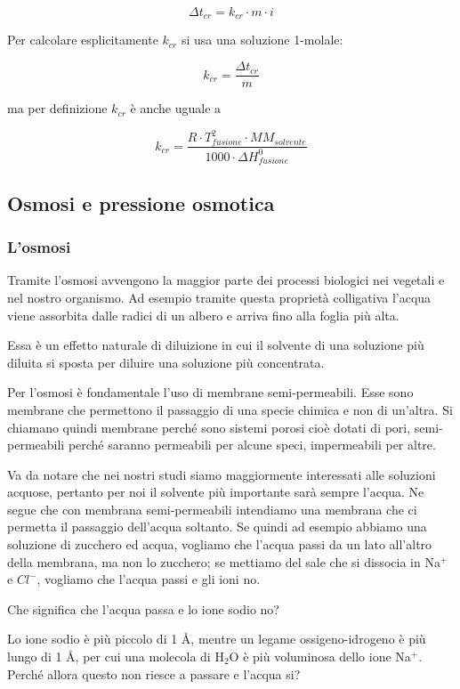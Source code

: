 $$\Delta t_{cr}=k_{cr} \cdot m \cdot i$$

Per calcolare esplicitamente $k_{cr}$ si usa una soluzione 1-molale:

$$k_{cr} = \frac{\Delta t_{cr}}{m}$$

ma per definizione $k_{cr}$ è anche uguale a

$$k_{cr}=\frac{R \cdot T_{fusione}^2 \cdot MM_{solvente}}{1000 \cdot \Delta H^0_{fusione}}$$

\subsection{Osmosi e pressione osmotica}
\subsubsection{L'osmosi}
Tramite l'osmosi avvengono la maggior parte dei processi biologici nei vegetali e nel nostro organismo. Ad esempio tramite questa proprietà colligativa l'acqua viene assorbita dalle radici di un albero e arriva fino alla foglia più alta.

Essa è un effetto naturale di diluizione in cui il solvente di una soluzione più diluita si sposta per diluire una soluzione più concentrata.

Per l'osmosi è fondamentale l'uso di membrane semi-permeabili. Esse sono membrane che permettono il passaggio di una specie chimica e non di un'altra. Si chiamano quindi membrane perché sono sistemi porosi cioè dotati di pori, semi-permeabili perché saranno permeabili per alcune speci, impermeabili per altre.

Va da notare che nei nostri studi siamo maggiormente interessati alle soluzioni acquose, pertanto per noi il solvente più importante sarà sempre l'acqua. Ne segue che con membrana semi-permeabili intendiamo una membrana che ci permetta il passaggio dell'acqua soltanto. Se quindi ad esempio abbiamo una soluzione di zucchero ed acqua, vogliamo che l'acqua passi da un lato all'altro della membrana, ma non lo zucchero; se mettiamo del sale che si dissocia in Na$^+$ e $Cl^-$, vogliamo che l'acqua passi e gli ioni no.

Che significa che l'acqua passa e lo ione sodio no?

Lo ione sodio è più piccolo di 1 Å, mentre un legame ossigeno-idrogeno è più lungo di 1 Å, per cui una molecola di H$_2$O è più voluminosa dello ione Na$^+$. Perché allora questo non riesce a passare e l'acqua si?

